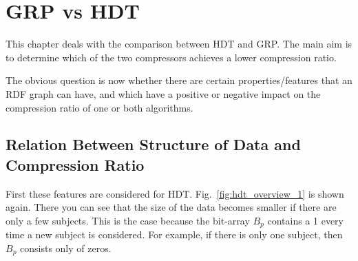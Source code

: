 %
%
%

\section{GRP vs HDT}\label{sec:approachGRPvsHDT}

This chapter deals with the comparison between HDT and GRP. The main aim is to determine which of the two compressors achieves a lower compression ratio.

The obvious question is now whether there are certain properties/features that an RDF graph can have, and which have a positive or negative impact on the compression ratio of one or both algorithms. 

\subsection{Relation Between Structure of Data and Compression Ratio}

First these features are considered for HDT. Fig.~\ref{fig:hdt_overview_1} is shown again. There you can see that the size of the data becomes smaller if there are only a few subjects. This is the case because the bit-array $B_p$ contains a 1 every time a new subject is considered. For example, if there is only one subject, then $B_p$ consists only of zeros.

